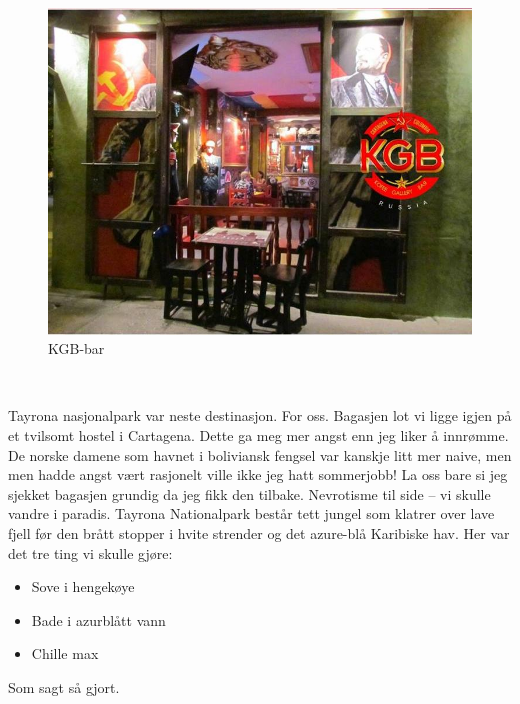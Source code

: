 \begin{figure}[!h]
	\centering
	\includegraphics[width=\textwidth]{kgbbar}
	\caption{KGB-bar}
	\label{fig:kgbbar}
\end{figure}\\
\clearpage

Tayrona nasjonalpark var neste destinasjon. For oss. Bagasjen lot vi
ligge igjen på et tvilsomt hostel i Cartagena. Dette ga meg mer angst
enn jeg liker å innrømme. De norske damene som havnet i boliviansk
fengsel var kanskje litt
mer naive, men men hadde angst vært rasjonelt ville ikke jeg
hatt sommerjobb! La oss bare si jeg sjekket bagasjen
grundig da jeg fikk den tilbake. Nevrotisme til side -- vi
skulle vandre i paradis. Tayrona Nationalpark består tett jungel som
klatrer over lave fjell før den brått stopper i hvite strender og det
azure-blå Karibiske hav. Her var det tre ting vi skulle gjøre:

\begin{itemize}
	\item Sove i hengekøye
	\item Bade i azurblått vann
	\item Chille max
\end{itemize}

Som sagt så gjort.

